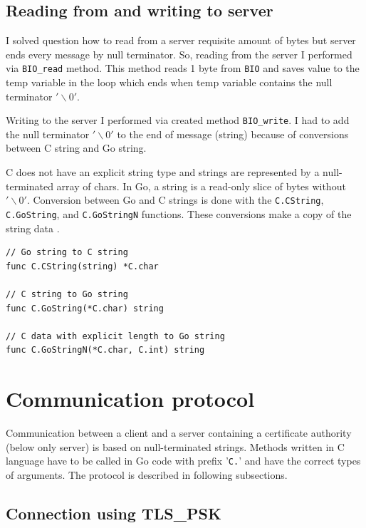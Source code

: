 \documentclass[
  12pt, 
  digital, %
  notable,   %
  nolof,     %
  nolot,     %
]{fithesis3}
\begin{document}
\subsection{Reading from and writing to server}

I solved question how to read from a server requisite amount of bytes but server ends every 
message by null terminator. So, reading from the server I performed via \texttt{BIO\_read} method. 
This method reads 1 byte from \texttt{BIO} and saves value to the temp variable in the loop which 
ends when temp variable contains the null terminator $'\backslash0'$. 

Writing to the server I performed via created method \texttt{BIO\_write}. I had to add the null 
terminator $'\backslash0'$ to the end of message (string) because of conversions between C string 
and Go string.

C does not have an explicit string type and strings are represented by a null-terminated array of 
chars. In Go, a string is a read-only slice of bytes without $'\backslash0'$. Conversion between 
Go and C strings is done with the \texttt{C.CString}, \texttt{C.GoString}, and 
\texttt{C.GoStringN} functions. These conversions make a copy of the string data 
\cite{bloggolangorg}. 

\begin{lstlisting}
// Go string to C string
func C.CString(string) *C.char

// C string to Go string
func C.GoString(*C.char) string

// C data with explicit length to Go string
func C.GoStringN(*C.char, C.int) string
\end{lstlisting}

\section{Communication protocol}\label{comprot}

Communication between a client and a server containing a certificate authority (below only server) 
is based on null-terminated strings. Methods written in C language have to be called in Go code 
with prefix '\texttt{C.}' and have the correct types of arguments. The protocol is described in following subsections.

\subsection{Connection using TLS\_PSK}
\end{document}
